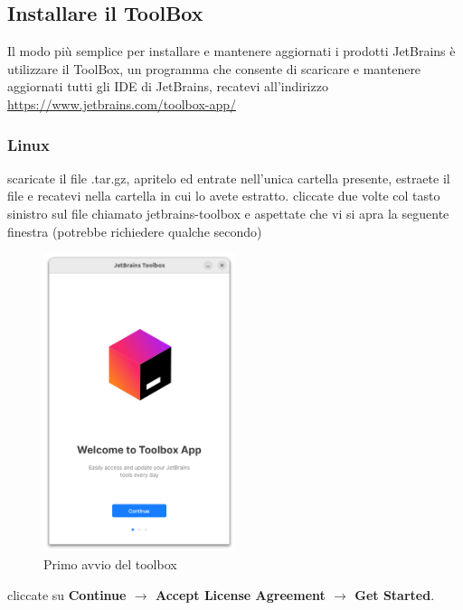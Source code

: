     \subsection{Installare il ToolBox}
        Il modo più semplice per installare e mantenere aggiornati i prodotti JetBrains è utilizzare il ToolBox, un programma che consente di scaricare e mantenere aggiornati 
        tutti gli IDE di JetBrains, recatevi all'indirizzo \url{https://www.jetbrains.com/toolbox-app/}
        \subsubsection{Linux}
            scaricate il file .tar.gz, apritelo ed entrate nell'unica cartella presente, estraete il file e recatevi nella cartella in cui lo avete estratto. cliccate due volte col tasto 
            sinistro sul file chiamato jetbrains-toolbox e aspettate che vi si apra la seguente finestra (potrebbe richiedere qualche secondo)
            \begin{figure}[H]
                \centering
                \graphicspath{{src/capitoli/04/img/}}
                \includegraphics[width=0.5\textwidth]{toolbox-primo-avvio.png}
                \caption{Primo avvio del toolbox}
                \label{fig:Primo avvio del toolbox}
            \end{figure}
            cliccate su \textbf{Continue $\rightarrow$ Accept License Agreement $\rightarrow$ Get Started}.
